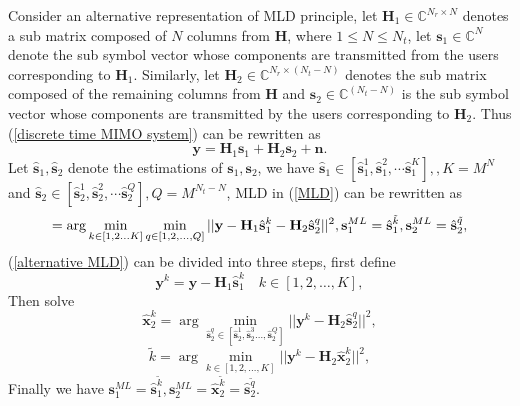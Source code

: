 \documentclass[12pt, draftclsnofoot, onecolumn]{IEEEtran}
\begin{document}
Consider an alternative representation of MLD principle, let $\mathbf{H}_{1}\in \mathbb{C}^{N_{r}\times N}$ denotes a sub matrix composed of $N$ columns from $\mathbf{H}$, where $1\leq N\leq N_{t}$, let $\mathbf{s}_{1}\in \mathbb{C}^{N}$ denote the sub symbol vector whose components are transmitted from the users corresponding to $\mathbf{H}_{1}$. Similarly, let $\mathbf{H}_{2}\in \mathbb{C}^{N_{r}\times (N_{t}-N)}$ denotes the sub matrix composed of the remaining columns from $\mathbf{H}$ and $\mathbf{s}_{2}\in \mathbb{C}^{(N_{t}-N)}$ is the sub symbol vector whose components are transmitted by the users corresponding to $\mathbf{H}_{2}$. Thus (\ref{discrete time MIMO system}) can be rewritten as 
\begin{equation}
\mathbf{y}=\mathbf{H}_{1}\mathbf{s}_{1}+\mathbf{H}_{2}\mathbf{s}_{2}+\mathbf{n}.
\label{alternative MIMO system}
\end{equation}  
Let $\hat{\mathbf{s}}_{1}, \hat{\mathbf{s}}_{2}$ denote the estimations of $\mathbf{s}_{1}, \mathbf{s}_{2}$, we have $\hat{\mathbf{s}}_{1}\in [\hat{\mathbf{s}}^{1}_{1}, \hat{\mathbf{s}}^{2}_{1}, \cdots \hat{\mathbf{s}}^{K}_{1}],, K=M^{N}$ and $\hat{\mathbf{s}}_{2}\in [\hat{\mathbf{s}}^{1}_{2}, \hat{\mathbf{s}}^{2}_{2}, \cdots \hat{\mathbf{s}}^{Q}_{2}], Q=M^{N_{t}-N}$, MLD in (\ref{MLD}) can be rewritten as 
\begin{equation}
[\tilde{k}, \tilde{q}]=\arg\min_{k\in [1,2\ldots K]}\min_{q\in [1,2,\ldots, Q]}||\mathbf{y}-\mathbf{H}_{1}\hat{\mathbf{s}}^{k}_{1}-\mathbf{H}_{2}\hat{\mathbf{s}}^{q}_{2}||^{2},\\
\mathbf{s}^{ML}_{1}=\hat{\mathbf{s}}^{\tilde{k}}_{1}, \mathbf{s}^{ML}_{2}=\hat{\mathbf{s}}^{\tilde{q}}_{2},
\label{alternative MLD}
\end{equation}
(\ref{alternative MLD}) can be divided into three steps, first define 
\begin{equation}
\mathbf{y}^{k}=\mathbf{y}-\mathbf{H}_{1}\hat{\mathbf{s}}^{k}_{1}\quad k\in [1,2,\ldots, K],
\label{first step alternative MLD}
\end{equation}
Then solve 
\begin{equation}
\hat{\mathbf{x}}_{2}^{k}=\arg\min_{\hat{\mathbf{s}}_{2}^{q}\in [\hat{\mathbf{s}}_{2}^{1},\hat{\mathbf{s}}_{2}^{3}\ldots, \hat{\mathbf{s}}_{2}^{Q}]}||\mathbf{y}^{k}-\mathbf{H}_{2}\hat{\mathbf{s}}_{2}^{q}||^{2}, 
\label{second step alternative MLD}
\end{equation}
\begin{equation}
\tilde{k}=\arg\min_{k\in [1,2,\ldots, K]}||\mathbf{y}^{k}-\mathbf{H}_{2}\hat{\mathbf{x}}_{2}^{k}||^{2},
\label{third step alternative MLD}
\end{equation}
Finally we have $\mathbf{s}_{1}^{ML}=\hat{\mathbf{s}}_{1}^{\tilde{k}}, \mathbf{s}_{2}^{ML}=\hat{\mathbf{x}}_{2}^{\tilde{k}}=\hat{\mathbf{s}}_{2}^{\tilde{q}}$.
\end{document}
